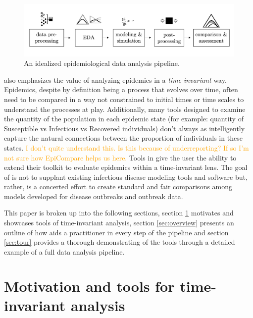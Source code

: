 \documentclass[
  shortnames]{jss}
\begin{document}
\begin{figure}[!ht]
    \centering
    \includegraphics[width = 1\textwidth]{images/pipeline1.png}
    \caption{An idealized epidemiological data analysis pipeline.}
    \label{fig:pipeline}
\end{figure}

 also emphasizes the value of analyzing epidemics in a
\textit{time-invariant} way. Epidemics, despite by definition being a
process that evolves over time, often need to be compared in a way not
constrained to initial times or time scales to understand the processes
at play. Additionally, many tools designed to examine the quantity of
the population in each epidemic state (for example: quantity of
Susceptible vs Infectious vs Recovered individuals) don't always as
intelligently capture the natural connections between the proportion of
individuals in these states.
\textcolor{orange}{I don't quite understand this.  Is this because of underreporting?  If so I'm not sure how EpiCompare helps us here.}
Tools in  give the user the ability to extend their
toolkit to evaluate epidemics within a time-invariant lens. The goal of
 is not to supplant existing infectious disease modeling
tools and software but, rather, is a concerted effort to create standard
and fair comparisons among models developed for disease outbreaks and
outbreak data.

This paper is broken up into the following sections, section
\ref{sec:time-invariant} motivates and showcases tools of time-invariant
analysis, section \ref{sec:overview} presents an outline of how
 aids a practitioner in every step of the pipeline and
section \ref{sec:tour} provides a thorough demonstrating of the tools
through a detailed example of a full data analysis pipeline.

\section[Time-invariant]{Motivation and tools for time-invariant
analysis}\label{sec:time-invariant}
\end{document}
